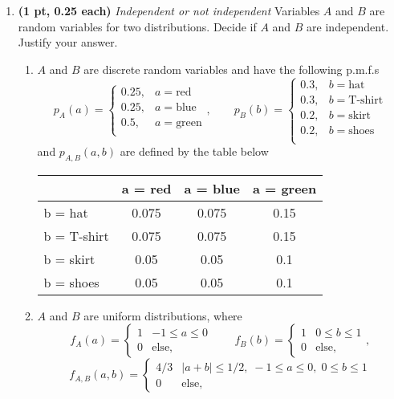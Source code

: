 \documentclass{article}
\newcommand{\showpoints}[1]{\textbf{(#1)}}
\begin{document}
\begin{enumerate}
\item \showpoints{1 pt, 0.25 each} \emph{Independent or not independent}
Variables $A$ and $B$ are random variables for two distributions. Decide if $A$ and $B$ are independent. Justify your answer.
\begin{enumerate}
\item $A$ and $B$ are discrete random variables and have the following p.m.f.s
\[
p_A(a) = \begin{cases}
0.25, & a = \text{red}\\
0.25, & a = \text{blue}\\
0.5, & a = \text{green}\\
\end{cases},
\qquad
p_B(b) = \begin{cases}
0.3, & b = \text{hat}\\
0.3, & b = \text{T-shirt}\\
0.2, & b = \text{skirt}\\
0.2, & b = \text{shoes}\\
\end{cases}
\]
and $p_{A,B}(a,b)$ are defined by the table below
\begin{center}
\begin{tabular}{l|ccc}
 & a = red & a = blue & a = green\\\hline
b = hat& 0.075 & 0.075 & 0.15\\
b = T-shirt& 0.075 & 0.075 & 0.15\\
b = skirt&0.05 & 0.05 & 0.1\\
b = shoes&0.05 & 0.05 & 0.1\\
\end{tabular} 
\end{center}



\item $A$ and $B$ are uniform distributions, where 
\[
f_A(a) = \begin{cases} 1 & -1 \leq a \leq 0 \\ 0 & \text{else,}
\end{cases}
\qquad
f_B(b) = \begin{cases} 1 & 0 \leq b \leq 1 \\ 0 & \text{else,}
\end{cases},\]
\[
f_{A,B}(a,b) = \begin{cases} 4/3 &  |a+b| \leq 1/2 , \;-1 \leq a \leq 0, \; 0 \leq b \leq 1\\ 0 & \text{else,}
\end{cases}
\]



\end{enumerate}
\end{enumerate}
\end{document}
